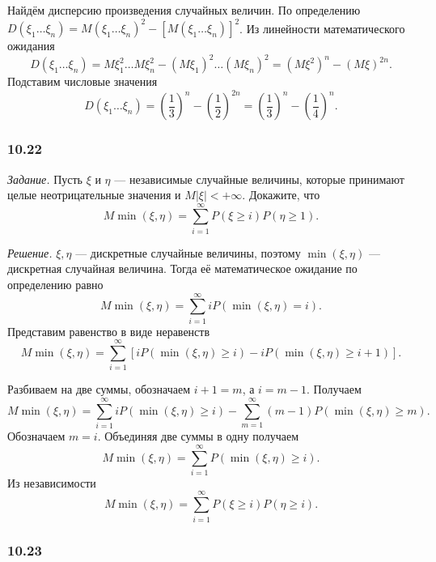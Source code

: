 Найдём дисперсию произведения случайных величин.
По определению $D \left( \xi_1 \dotsc \xi_n \right) = M \left( \xi_1 \dotsc \xi_n \right)^2 - \left[ M \left( \xi_1 \dotsc \xi_n \right) \right]^2$.
Из линейности математического ожидания
$$D \left( \xi_1 \dotsc \xi_n \right) =
M \xi_1^2 \dotsc M \xi_n^2 - \left( M \xi_1 \right)^2 \dotsc \left( M \xi_n \right)^2 =
\left( M \xi^2 \right)^n - \left( M \xi \right)^{2n}.$$
Подставим числовые значения
$$D \left( \xi_1 \dotsc \xi_n \right) =
\left( \frac{1}{3} \right)^n - \left( \frac{1}{2} \right)^{2n} =
\left( \frac{1}{3} \right)^n - \left( \frac{1}{4} \right)^n.$$

\subsubsection*{10.22}

\textit{Задание.} Пусть $ \xi $ и $ \eta $ --- независимые случайные величины, которые принимают целые неотрицательные значения и $M \left| \xi \right| < + \infty $.
Докажите, что
$$M \min \left( \xi, \eta \right) =
\sum \limits_{i=1}^{ \infty } P \left( \xi \geq i \right) P \left( \eta \geq 1 \right).$$

\textit{Решение.} $ \xi, \eta $ --- дискретные случайные величины, поэтому $ \min \left( \xi, \eta \right) $ --- дискретная случайная величина.
Тогда её математическое ожидание по определению равно
$$M \min \left( \xi, \eta \right) =
\sum \limits_{i=1}^{ \infty } iP \left( \min \left( \xi, \eta \right) = i \right).$$
Представим равенство в виде неравенств
$$M \min \left( \xi, \eta \right) =
\sum \limits_{i=1}^{ \infty } \left[ iP \left( \min \left( \xi, \eta \right) \geq i \right) -
iP \left( \min \left( \xi, \eta \right) \geq i + 1 \right) \right].$$

Разбиваем на две суммы, обозначаем $i + 1 = m$, а $i = m - 1$.
Получаем
$$M \min \left( \xi, \eta \right) =
\sum \limits_{i=1}^{ \infty } iP \left( \min \left( \xi, \eta \right) \geq i \right) -
\sum \limits_{m=1}^{ \infty } \left( m-1 \right) P \left( \min \left( \xi, \eta \right) \geq m \right).$$
Обозначаем $m = i$.
Объединяя две суммы в одну получаем
$$M \min \left( \xi, \eta \right) =
\sum \limits_{i=1}^{ \infty } P \left( \min \left( \xi, \eta \right) \geq i \right).$$
Из независимости
$$M \min \left( \xi, \eta \right) =
\sum \limits_{i=1}^{ \infty } P \left( \xi \geq i \right) P \left( \eta \geq i \right).$$

\subsubsection*{10.23}

